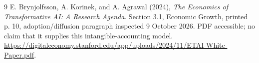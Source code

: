 \documentclass[11pt]{article}
\theoremstyle{remark}
\begin{document}
\begin{thebibliography}{9}
 E. Brynjolfsson, A. Korinek, and A. Agrawal (2024), \emph{The Economics of Transformative AI: A Research Agenda}. Section 3.1, Economic Growth, printed p. 10, adoption/diffusion paragraph inspected 9 October 2026. PDF accessible; no claim that it supplies this intangible-accounting model. \url{https://digitaleconomy.stanford.edu/app/uploads/2024/11/ETAI-White-Paper.pdf}.
\end{thebibliography}
\end{document}
